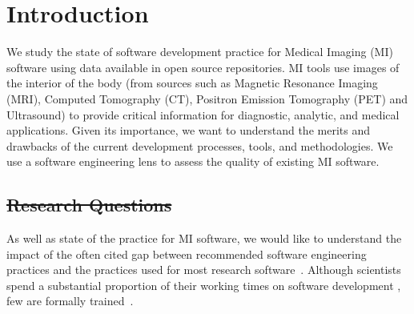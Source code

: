 \documentclass[12pt, 3p, times]{elsarticle} %
\makeatletter
\providecommand{\DIFdeltex}[1]{{\protect\color{red}\sout{#1}}} %
\providecommand{\DIFdelbegin}{} %
\providecommand{\DIFdelend}{} %
\providecommand{\DIFdel}[1]{\texorpdfstring{\DIFdeltex{#1}}{}} %
\let\sout@orig\sout %
\renewcommand{\sout}[1]{\ifmmode\text{\sout@orig{\ensuremath{#1}}}\else\sout@orig{#1}\fi} %
\makeatother
\begin{document}

\section{Introduction} \label{ch_intro}

We study the state of software development practice for Medical Imaging
(MI) software using data available in open source repositories.  MI tools use
images of the interior of the body (from sources such as Magnetic Resonance
Imaging (MRI), Computed Tomography (CT), Positron Emission Tomography (PET) and
Ultrasound) to provide critical information for diagnostic, analytic, and medical
applications. Given its importance, we want to understand the merits and
drawbacks of the current development processes, tools, and methodologies. We
use a software engineering lens to assess the quality of existing MI software.

\DIFdelbegin \subsection{\DIFdel{Research Questions}} %
\addtocounter{subsection}{-1}%
\DIFdelend %

As well as state of the practice for MI software, we would like to understand
the impact of the often cited gap between recommended software engineering
practices and the practices used for most research software~\cite{Storer2017}. Although
scientists spend a substantial proportion of their working times on software
development \cite{Hannay2009, Prabhu2011}, few are formally
trained~\cite{Hannay2009}.
\end{document}
